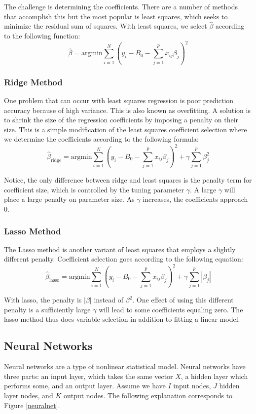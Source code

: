 \documentclass[12pt]{article}
\begin{document}
The challenge is determining the coefficients. There are a number of methods that accomplish this but the most popular is least squares, which seeks to minimize the residual sum of squares. 
With least squares, we select $\hat{\beta}$ according to the following function:
$$\hat{\beta} = \text{argmin} \sum_{i=1}^{N} (y_i - B_0 - \sum_{j=1}^{p} x_{ij} \beta_j)^2$$
\cite[42]{springer}


\subsubsection{Ridge Method}
One problem that can occur with least squares regression is poor prediction accuracy because of high variance. \cite[55]{springer} This is also known as overfitting. A solution is to shrink the size of the regression coefficients by imposing a penalty on their size. This is a simple modification of the least squares coefficient selection where we determine the coefficients according to the following formula: 
$$\hat{\beta}_{\text{ridge}} = \text{argmin} \sum_{i=1}^{N} (y_i - B_0 - \sum_{j=1}^{p} x_{ij} \beta_j)^2 + \gamma \sum_{j=1}^{p}\beta_j^2$$
\cite[59]{springer}

Notice, the only difference between ridge and least squares is the penalty term for coefficient size, which is controlled by the tuning parameter $\gamma$. A large $\gamma$ will place a large penalty on parameter size. As $\gamma$ increases, the coefficients approach 0. 

\subsubsection{Lasso Method}
The Lasso method is another variant of least squares that employs a slightly different penalty. Coefficient selection goes according to the following equation:
$$\hat{\beta}_{\text{lasso}} = \text{argmin} \sum_{i=1}^{N} (y_i - B_0 - \sum_{j=1}^{p} x_{ij} \beta_j)^2 + \gamma \sum_{j=1}^{p}|\beta_j|$$

With lasso, the penalty is $|\beta|$ instead of $\beta^2$. One effect of using this different penalty is a sufficiently large $\gamma$ will lead to some coefficients equaling zero. The lasso method thus does variable selection in addition to fitting a linear model. \cite[64]{springer}

\subsection{Neural Networks}
Neural networks are a type of nonlinear statistical model. Neural networks have three parts: an input layer, which takes the same vector $X$, a hidden layer which performs some, and an output layer. Assume we have $I$ input nodes, $J$ hidden layer nodes, and $K$ output nodes. The following explanation corresponds to Figure \ref{neuralnet}. 
\end{document}
